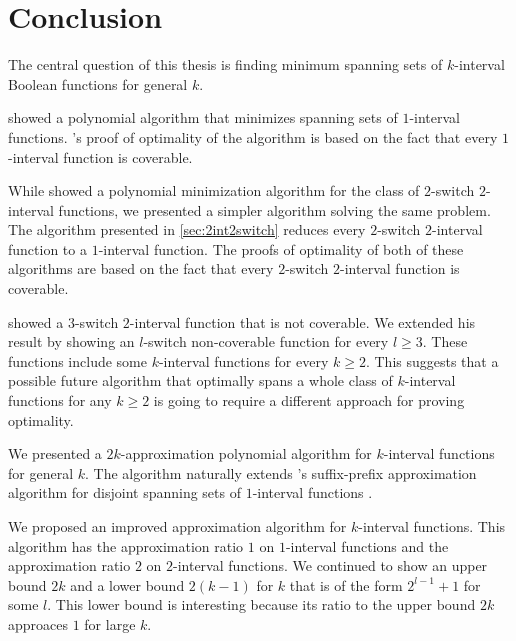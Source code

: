 \chapter*{Conclusion}


The central question of this thesis
is finding minimum spanning sets
of $k$-interval Boolean functions
for general $k$.

\citeauthor{Schieber2005154} showed a polynomial algorithm
that minimizes spanning sets of $1$-interval functions.
\citeauthor{Schieber2005154}'s proof of optimality
of the algorithm
is based on the fact that every $1$-interval function
is coverable.

While \citeauthor{Dubovsky2012} showed
a polynomial minimization algorithm
for the class of $2$-switch $2$-interval functions,
we presented a simpler algorithm
solving the same problem.
The algorithm presented in \cref{sec:2int2switch}
reduces every $2$-switch $2$-interval function
to a $1$-interval function.
The proofs of optimality of both of these algorithms
are based on the fact that every $2$-switch $2$-interval
function is coverable.

\citeauthor{Dubovsky2012} showed
a $3$-switch $2$-interval function
that is not coverable.
We extended his result by showing
an $l$-switch non-coverable function for every $l \geq 3$.
These functions include some $k$-interval functions
for every $k \geq 2$.
This suggests that a possible future algorithm
that optimally spans a whole class
of $k$-interval functions
for any $k \geq 2$
is going to require a different approach
for proving optimality.

We presented a $2k$-approximation polynomial algorithm
for $k$-interval functions for general $k$.
The algorithm naturally extends
\citeauthor{Schieber2005154}'s suffix-prefix
approximation algorithm
for disjoint spanning sets of $1$-interval functions
\citep[section 6]{Schieber2005154}.

We proposed an improved approximation algorithm
for $k$-interval functions.
This algorithm has the approximation ratio $1$
on $1$-interval functions
and the approximation ratio $2$
on $2$-interval functions.
We continued to show an upper bound $2k$
and a lower bound $2(k-1)$
for $k$ that is of the form $2^{l-1}+1$ for some $l$.
This lower bound is interesting
because its ratio to the upper bound $2k$ approaces $1$
for large $k$.

